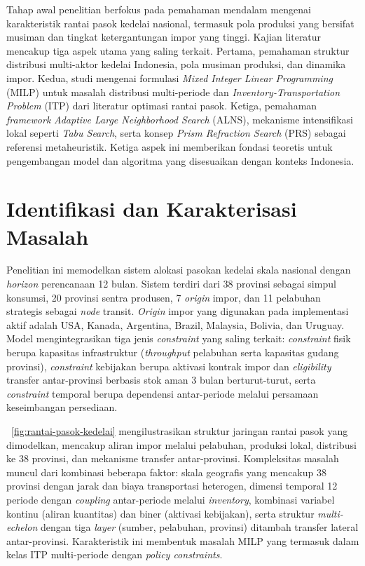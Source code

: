 \documentclass{file/TA-ITS}
\theoremstyle{definition}
\theoremstyle{definition}
\theoremstyle{plain}
\begin{document}
Tahap awal penelitian berfokus pada pemahaman mendalam mengenai karakteristik rantai pasok kedelai nasional, termasuk pola produksi yang bersifat musiman dan tingkat ketergantungan impor yang tinggi. Kajian literatur mencakup tiga aspek utama yang saling terkait. Pertama, pemahaman struktur distribusi multi-aktor kedelai Indonesia, pola musiman produksi, dan dinamika impor. Kedua, studi mengenai formulasi \textit{Mixed Integer Linear Programming} (MILP) untuk masalah distribusi multi-periode dan \textit{Inventory-Transportation Problem} (ITP) dari literatur optimasi rantai pasok. Ketiga, pemahaman \textit{framework} \textit{Adaptive Large Neighborhood Search} (ALNS), mekanisme intensifikasi lokal seperti \textit{Tabu Search}, serta konsep \textit{Prism Refraction Search} (PRS) sebagai referensi metaheuristik. Ketiga aspek ini memberikan fondasi teoretis untuk pengembangan model dan algoritma yang disesuaikan dengan konteks Indonesia.

\section{Identifikasi dan Karakterisasi Masalah}

Penelitian ini memodelkan sistem alokasi pasokan kedelai skala nasional dengan \textit{horizon} perencanaan 12 bulan. Sistem terdiri dari 38 provinsi sebagai simpul konsumsi, 20 provinsi sentra produsen, 7 \textit{origin} impor, dan 11 pelabuhan strategis sebagai \textit{node} transit. \textit{Origin} impor yang digunakan pada implementasi aktif adalah USA, Kanada, Argentina, Brazil, Malaysia, Bolivia, dan Uruguay. Model mengintegrasikan tiga jenis \textit{constraint} yang saling terkait: \textit{constraint} fisik berupa kapasitas infrastruktur (\textit{throughput} pelabuhan serta kapasitas gudang provinsi), \textit{constraint} kebijakan berupa aktivasi kontrak impor dan \textit{eligibility} transfer antar-provinsi berbasis stok aman 3 bulan berturut-turut, serta \textit{constraint} temporal berupa dependensi antar-periode melalui persamaan keseimbangan persediaan.

~\ref{fig:rantai-pasok-kedelai} mengilustrasikan struktur jaringan rantai pasok yang dimodelkan, mencakup aliran impor melalui pelabuhan, produksi lokal, distribusi ke 38 provinsi, dan mekanisme transfer antar-provinsi. Kompleksitas masalah muncul dari kombinasi beberapa faktor: skala geografis yang mencakup 38 provinsi dengan jarak dan biaya transportasi heterogen, dimensi temporal 12 periode dengan \textit{coupling} antar-periode melalui \textit{inventory}, kombinasi variabel kontinu (aliran kuantitas) dan biner (aktivasi kebijakan), serta struktur \textit{multi-echelon} dengan tiga \textit{layer} (sumber, pelabuhan, provinsi) ditambah transfer lateral antar-provinsi. Karakteristik ini membentuk masalah MILP yang termasuk dalam kelas ITP multi-periode dengan \textit{policy constraints}.
\end{document}
